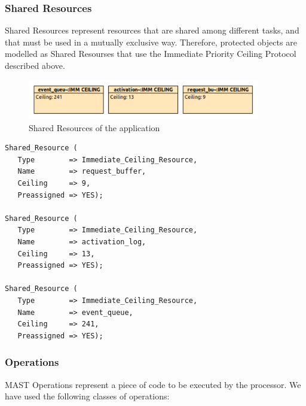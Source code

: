 \documentclass{article}
\begin{document}
\subsubsection{Shared Resources}

Shared Resources represent resources that are shared among different tasks, and that must be used in a mutually exclusive way. Therefore, protected objects are modelled as Shared Resourses that use the Immediate Priority Ceiling Protocol described above.

\begin{figure}[!htbp]
\centering
\includegraphics[width=4in]{images/shared-resources}
\caption{Shared Resources of the application}
\label{shared-resources}
\end{figure}

\begin{lstlisting}
Shared_Resource (
   Type        => Immediate_Ceiling_Resource,
   Name        => request_buffer,
   Ceiling     => 9,
   Preassigned => YES);

Shared_Resource (
   Type        => Immediate_Ceiling_Resource,
   Name        => activation_log,
   Ceiling     => 13,
   Preassigned => YES);

Shared_Resource (
   Type        => Immediate_Ceiling_Resource,
   Name        => event_queue,
   Ceiling     => 241,
   Preassigned => YES);
\end{lstlisting}

\subsubsection{Operations}

MAST Operations represent a piece of code to be executed by the processor. We have used the following classes of operations:
\end{document}
